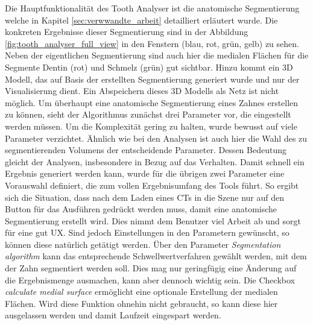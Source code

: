 Die Hauptfunktionalität des Tooth Analyser ist die anatomische Segmentierung welche
in Kapitel \ref{sec:verwwandte_arbeit} detailliert erläutert wurde. Die
konkreten Ergebnisse dieser Segmentierung sind in der Abbildung
\ref{fig:tooth_analyser_full_view} in den Fenstern (blau, rot, grün, gelb) zu sehen.
Neben der eigentlichen Segmentierung sind auch hier die medialen Flächen für die
Segmente Dentin (rot) und Schmelz (grün) gut sichtbar. Hinzu kommt ein \ac{3D}
Modell, das auf Basis der erstellten Segmentierung generiert wurde und nur der Visualisierung
dient. Ein Abspeichern dieses 3D Modells als Netz ist nicht möglich. Um überhaupt
eine anatomische Segmentierung eines Zahnes erstellen zu können, sieht der
Algorithmus zunächst drei Parameter vor, die eingestellt werden müssen. Um die
Komplexität gering zu halten, wurde bewusst auf viele Parameter verzichtet.
Ähnlich wie bei den Analysen ist auch hier die Wahl des zu segmentierenden
Volumens der entscheidende Parameter. Dessen Bedeutung gleicht der Analysen,
insbesondere in Bezug auf das Verhalten. Damit schnell ein Ergebnis generiert werden
kann, wurde für die übrigen zwei Parameter eine Vorauswahl definiert, die zum vollen
Ergebnisumfang des Tools führt. So ergibt sich die Situation, dass nach dem Laden
eines \ac{CT}s in die Szene nur auf den Button für das Ausführen gedrückt werden
muss, damit eine anatomische Segmentierung erstellt wird. Dies nimmt dem Benutzer
viel Arbeit ab und sorgt für eine gut \ac{UX}. Sind jedoch Einstellungen in den Parametern
gewünscht, so können diese natürlich getätigt werden. Über den Parameter \textit{Segmentation
algorithm} kann das entsprechende Schwellwertverfahren gewählt werden, mit dem der
Zahn segmentiert werden soll. Dies mag nur geringfügig eine Änderung auf die
Ergebnismenge ausmachen, kann aber dennoch wichtig sein. Die Checkbox \textit{calculate
medial surface} ermöglicht eine optionale Erstellung der medialen Flächen. Wird
diese Funktion ohnehin nicht gebraucht, so kann diese hier ausgelassen werden und
damit Laufzeit eingespart werden.

